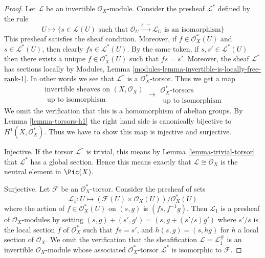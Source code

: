 \begin{proof}
Let $\mathcal{L}$ be an invertible $\mathcal{O}_X$-module.
Consider the presheaf $\mathcal{L}^*$ defined by the rule
$$
U \longmapsto \{s \in \mathcal{L}(U)
\text{ such that } \mathcal{O}_U \xrightarrow{s \cdot -} \mathcal{L}_U
\text{ is an isomorphism}\}
$$
This presheaf satisfies the sheaf condition. Moreover, if
$f \in \mathcal{O}_X^*(U)$ and $s \in \mathcal{L}^*(U)$, then clearly
$fs \in \mathcal{L}^*(U)$. By the same token, if $s, s' \in \mathcal{L}^*(U)$
then there exists a unique $f \in \mathcal{O}_X^*(U)$ such that
$fs = s'$. Moreover, the sheaf $\mathcal{L}^*$ has sections locally
by Modules, Lemma \ref{modules-lemma-invertible-is-locally-free-rank-1}.
In other words we
see that $\mathcal{L}^*$ is a $\mathcal{O}_X^*$-torsor. Thus we get
a map
$$
\begin{matrix}
\text{invertible sheaves on }(X, \mathcal{O}_X) \\
\text{ up to isomorphism}
\end{matrix}
\longrightarrow
\begin{matrix}
\mathcal{O}_X^*\text{-torsors} \\
\text{ up to isomorphism}
\end{matrix}
$$
We omit the verification that this is a homomorphism of abelian groups.
By
Lemma \ref{lemma-torsors-h1}
the right hand side is canonically
bijective to $H^1(X, \mathcal{O}_X^*)$.
Thus we have to show this map is injective and surjective.

\medskip\noindent
Injective. If the torsor $\mathcal{L}^*$ is trivial, this means by
Lemma \ref{lemma-trivial-torsor}
that $\mathcal{L}^*$ has a global section.
Hence this means exactly that $\mathcal{L} \cong \mathcal{O}_X$ is
the neutral element in $\Pic(X)$.

\medskip\noindent
Surjective. Let $\mathcal{F}$ be an $\mathcal{O}_X^*$-torsor.
Consider the presheaf of sets
$$
\mathcal{L}_1 : U \longmapsto
(\mathcal{F}(U) \times \mathcal{O}_X(U))/\mathcal{O}_X^*(U)
$$
where the action of $f \in \mathcal{O}_X^*(U)$ on
$(s, g)$ is $(fs, f^{-1}g)$. Then $\mathcal{L}_1$ is a presheaf
of $\mathcal{O}_X$-modules by setting
$(s, g) + (s', g') = (s, g + (s'/s)g')$ where $s'/s$ is the local
section $f$ of $\mathcal{O}_X^*$ such that $fs = s'$, and
$h(s, g) = (s, hg)$ for $h$ a local section of $\mathcal{O}_X$.
We omit the verification that the sheafification
$\mathcal{L} = \mathcal{L}_1^\#$ is an invertible $\mathcal{O}_X$-module
whose associated $\mathcal{O}_X^*$-torsor $\mathcal{L}^*$ is isomorphic
to $\mathcal{F}$.
\end{proof}













